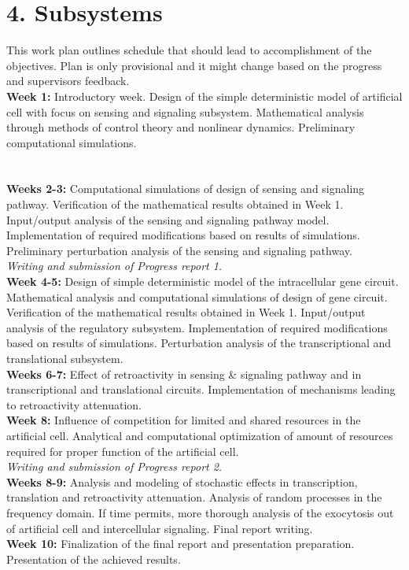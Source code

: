 \documentclass{article}
\begin{document}
	\section*{4. Subsystems}
This work plan outlines schedule that should lead to accomplishment of the objectives. Plan is only provisional and it might change based on the progress and supervisor\textquotesingle s feedback.\\
\textbf{Week 1:} Introductory week. Design of the simple deterministic model of artificial cell with focus on sensing and signaling subsystem. Mathematical analysis through methods of control theory and nonlinear dynamics. Preliminary computational simulations.\\ \\ \\
\textbf{Weeks 2-3:} Computational simulations of design of sensing and signaling pathway. Verification of the mathematical results obtained in Week 1. Input/output analysis of the sensing and signaling pathway model. Implementation of required modifications based on results of simulations. Preliminary perturbation analysis of the sensing and signaling pathway.\\ 
\textit{Writing and submission of Progress report 1.}\\
\textbf{Week 4-5:} Design of simple deterministic model of the intracellular gene circuit. Mathematical analysis and computational simulations of design of gene circuit. Verification of the mathematical results obtained in Week 1. Input/output analysis of the regulatory subsystem. Implementation of required modifications based on results of simulations. Perturbation analysis of the transcriptional and translational subsystem.\\ 
\textbf{Weeks 6-7:} Effect of retroactivity in sensing \& signaling pathway and in transcriptional and translational circuits. Implementation of mechanisms leading to retroactivity attenuation.\\
\textbf{Week 8:} Influence of competition for limited and shared resources in the artificial cell. Analytical and computational optimization of amount of resources required for proper function of the artificial cell.\\
\textit{Writing and submission of Progress report 2.}\\
\textbf{Weeks 8-9:} Analysis and modeling of stochastic effects in transcription, translation and retroactivity attenuation. Analysis of random processes in the frequency domain. If time permits, more thorough analysis of the exocytosis out of artificial cell and intercellular signaling. Final report writing.\\
\textbf{Week 10:} Finalization of the final report and presentation preparation. Presentation of the achieved results.\\
\end{document}
